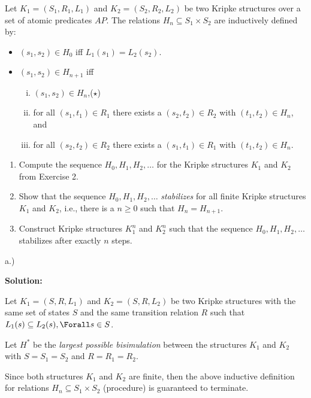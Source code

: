 
Let $K_1 = (S_1, R_1, L_1)$ and  $K_2 = (S_2, R_2, L_2)$ be two Kripke structures over a set of atomic predicates $\mathit{AP}$.
The relations $H_n \subseteq S_1 \times S_2$ are inductively defined by:
\begin{itemize}
\item $(s_1,s_2) \in H_0$ iff $L_1(s_1) = L_2(s_2)$.
\item $(s_1,s_2) \in H_{n+1}$ iff
    \begin{enumerate}[(i)]
    \item $(s_1,s_2) \in H_n$,\qquad ($\star$)
    \item for all $(s_1,t_1) \in R_1$ there exists a $(s_2,t_2) \in R_2$ with $(t_1,t_2) \in H_n$, and
    \item for all $(s_2,t_2) \in R_2$ there exists a $(s_1,t_1) \in R_1$ with $(t_1,t_2) \in H_n$.
    \end{enumerate}
\end{itemize}

\begin{enumerate}

	\item Compute the sequence $H_0, H_1, H_2,\ldots$ for the Kripke structures $K_1$ and $K_2$ from Exercise 2.
    
	\item Show that the sequence $H_0, H_1, H_2,\ldots$ \emph{stabilizes} for all finite Kripke structures $K_1$ and $K_2$, i.e., there is a $n \ge 0$ such that $H_n = H_{n+1}$.
    
	\item Construct Kripke structures $K_1^n$ and $K_2^n$ such that the sequence $H_0, H_1, H_2,\ldots$ stabilizes after exactly $n$ steps.

\end{enumerate}

a.)

\textbf{Solution:}

\bigskip

Let $K_{1}=(S,R,L_{1})$ and $K_{2}=(S,R,L_{2})$ be two Kripke structures
with the same set of states $S$ and the same transition relation $R$ such
that $L_{1}(s)\subseteq L_{2}(s),\Forall s\in S$.\medskip

Let $H^{\ast }$ be the \textit{largest possible bisimulation} between the
structures $K_{1}$ and $K_{2}$ with $S=S_{1}=S_{2}$ and $R=R_{1}=R_{2}$.

Since both structures $K_{1}$ and $K_{2}$ are finite, then the above
inductive definition for relations $H_{n}\subseteq S_{1}\times S_{2}$
(procedure) is guaranteed to terminate.

